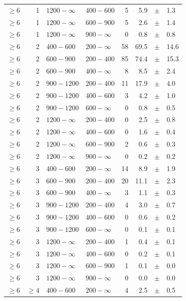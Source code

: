 \begin{table}[!h]
\begin{tabular}{rrllrrcl}
$\geq 6$ & 1 & $1200- \infty$ & $400-600$ &      5 &      5.9 &$\pm$&    1.3 \\
$\geq 6$ & 1 & $1200- \infty$ & $600-900$ &      5 &      2.6 &$\pm$&    1.4 \\
$\geq 6$ & 1 & $1200- \infty$ & $900-\infty$ &      0 &      0.8 &$\pm$&    0.8 \\
$\geq 6$\T & 2 & $ 400- 600$ & $200-\infty$ &     58 &     69.5 &$\pm$&   14.6 \\
$\geq 6$\T & 2 & $ 600- 900$ & $200-400$ &     85 &     74.4 &$\pm$&   15.3 \\
$\geq 6$ & 2 & $ 600- 900$ & $400-\infty$ &      8 &      8.5 &$\pm$&    2.4 \\
$\geq 6$\T & 2 & $ 900-1200$ & $200-400$ &     11 &     17.9 &$\pm$&    4.0 \\
$\geq 6$ & 2 & $ 900-1200$ & $400-600$ &      3 &      4.2 &$\pm$&    1.0 \\
$\geq 6$ & 2 & $ 900-1200$ & $600-\infty$ &      0 &      0.8 &$\pm$&    0.5 \\
$\geq 6$\T & 2 & $1200- \infty$ & $200-400$ &      0 &      2.5 &$\pm$&    0.8 \\
$\geq 6$ & 2 & $1200- \infty$ & $400-600$ &      0 &      1.6 &$\pm$&    0.4 \\
$\geq 6$ & 2 & $1200- \infty$ & $600-900$ &      2 &      0.6 &$\pm$&    0.3 \\
$\geq 6$ & 2 & $1200- \infty$ & $900-\infty$ &      0 &      0.2 &$\pm$&    0.2 \\
$\geq 6$\T & 3 & $ 400- 600$ & $200-\infty$ &     14 &      8.9 &$\pm$&    1.9 \\
$\geq 6$\T & 3 & $ 600- 900$ & $200-400$ &     20 &     11.1 &$\pm$&    2.3 \\
$\geq 6$ & 3 & $ 600- 900$ & $400-\infty$ &      3 &      1.1 &$\pm$&    0.3 \\
$\geq 6$\T & 3 & $ 900-1200$ & $200-400$ &      4 &      3.0 &$\pm$&    0.7 \\
$\geq 6$ & 3 & $ 900-1200$ & $400-600$ &      0 &      0.6 &$\pm$&    0.2 \\
$\geq 6$ & 3 & $ 900-1200$ & $600-\infty$ &      0 &      0.1 &$\pm$&    0.1 \\
$\geq 6$\T & 3 & $1200- \infty$ & $200-400$ &      1 &      0.4 &$\pm$&    0.1 \\
$\geq 6$ & 3 & $1200- \infty$ & $400-600$ &      0 &      0.2 &$\pm$&    0.1 \\
$\geq 6$ & 3 & $1200- \infty$ & $600-900$ &      1 &      0.1 &$\pm$&    0.0 \\
$\geq 6$ & 3 & $1200- \infty$ & $900-\infty$ &      0 &      0.0 &$\pm$&    0.0 \\
$\geq 6$\T & $\geq 4$ & $ 400- 600$ & $200-\infty$ &      4 &      2.5 &$\pm$&    0.5 \\
    \hline
  \end{tabular}
\end{table}

